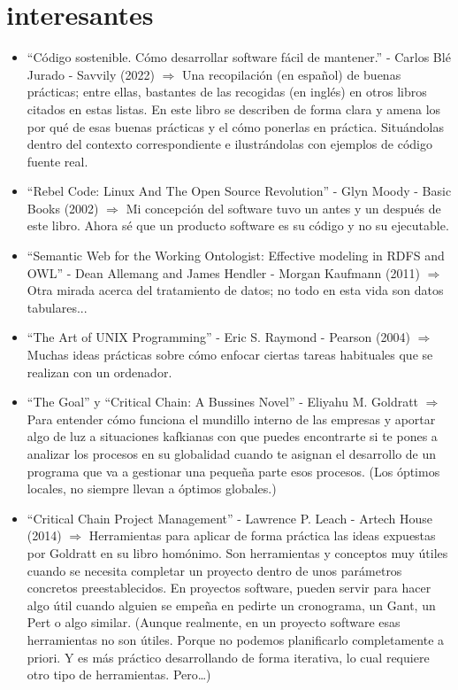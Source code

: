 \documentclass[spanish,12pt,a4paper,final,oneside]{book}
\begin{document}
\section{interesantes}

\begin{itemize}

\item ``Código sostenible. Cómo desarrollar software fácil de mantener.'' - Carlos Blé Jurado - Savvily (2022) $\Rightarrow$ Una recopilación  (en español) de buenas prácticas; entre ellas, bastantes de las recogidas (en inglés) en otros libros citados en estas listas. En este libro se describen de forma clara y amena los por qué de esas buenas prácticas y el cómo ponerlas en práctica. Situándolas dentro del contexto correspondiente e ilustrándolas con ejemplos de código fuente real.

\item ``Rebel Code: Linux And The Open Source Revolution'' - Glyn Moody - Basic Books (2002) $\Rightarrow$ Mi concepción del software tuvo un antes y un después de este libro. Ahora sé que un producto software es su código y no su ejecutable.

\item ``Semantic Web for the Working Ontologist: Effective modeling in RDFS and OWL'' - Dean Allemang and James Hendler - Morgan Kaufmann (2011) $\Rightarrow$ Otra mirada acerca del tratamiento de datos; no todo en esta vida son datos tabulares...

\item ``The Art of UNIX Programming'' - Eric S. Raymond - Pearson (2004) $\Rightarrow$ Muchas ideas prácticas sobre cómo enfocar ciertas tareas habituales que se realizan con un ordenador.

\item ``The Goal'' y ``Critical Chain: A Bussines Novel'' - Eliyahu M. Goldratt $\Rightarrow$ Para entender cómo funciona el mundillo interno de las empresas y aportar algo de luz a situaciones kafkianas con que puedes encontrarte si te pones a analizar los procesos en su globalidad cuando te asignan el desarrollo de un programa que va a gestionar una pequeña parte esos procesos. (Los óptimos locales, no siempre llevan a óptimos globales.)

\item ``Critical Chain Project Management'' - Lawrence P. Leach - Artech House (2014) $\Rightarrow$ Herramientas para aplicar de forma práctica las ideas expuestas por Goldratt en su libro homónimo. Son herramientas y conceptos muy útiles cuando se necesita completar un proyecto dentro de unos parámetros concretos preestablecidos. En proyectos software, pueden servir para hacer algo útil cuando alguien se empeña en pedirte un cronograma, un Gant, un Pert o algo similar. (Aunque realmente, en un proyecto software esas herramientas no son útiles. Porque no podemos planificarlo completamente a priori.  Y es más práctico desarrollando de forma iterativa, lo cual requiere otro tipo de herramientas. Pero\ldots)


\end{itemize}
\end{document}
